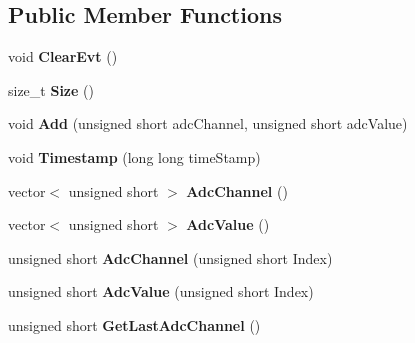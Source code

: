 \subsection*{Public Member Functions}
\begin{DoxyCompactItemize}
\item 
\hypertarget{class_adc_sub_event_a6921cc7a76de6c57de1f4505aa3a0fc6}{void {\bfseries Clear\-Evt} ()}\label{class_adc_sub_event_a6921cc7a76de6c57de1f4505aa3a0fc6}

\item 
\hypertarget{class_adc_sub_event_aefa9fcc6a598d13e775ef6ab3a4c8d57}{size\-\_\-t {\bfseries Size} ()}\label{class_adc_sub_event_aefa9fcc6a598d13e775ef6ab3a4c8d57}

\item 
\hypertarget{class_adc_sub_event_afff9f0777f4eed5da2e596d65247d1ff}{void {\bfseries Add} (unsigned short adc\-Channel, unsigned short adc\-Value)}\label{class_adc_sub_event_afff9f0777f4eed5da2e596d65247d1ff}

\item 
\hypertarget{class_adc_sub_event_a9ae27303e054dc233160f03360f5d9db}{void {\bfseries Timestamp} (long long time\-Stamp)}\label{class_adc_sub_event_a9ae27303e054dc233160f03360f5d9db}

\item 
\hypertarget{class_adc_sub_event_ae9b2f13ea3c9f93a5ad9c976aacd986e}{vector$<$ unsigned short $>$ {\bfseries Adc\-Channel} ()}\label{class_adc_sub_event_ae9b2f13ea3c9f93a5ad9c976aacd986e}

\item 
\hypertarget{class_adc_sub_event_ac35e71c13f62eff54dff047c81dc87e1}{vector$<$ unsigned short $>$ {\bfseries Adc\-Value} ()}\label{class_adc_sub_event_ac35e71c13f62eff54dff047c81dc87e1}

\item 
\hypertarget{class_adc_sub_event_acbd64195813827ddec628afa090978cf}{unsigned short {\bfseries Adc\-Channel} (unsigned short Index)}\label{class_adc_sub_event_acbd64195813827ddec628afa090978cf}

\item 
\hypertarget{class_adc_sub_event_a076eeb66b1edcde4fa6bce1a3c5c2bb1}{unsigned short {\bfseries Adc\-Value} (unsigned short Index)}\label{class_adc_sub_event_a076eeb66b1edcde4fa6bce1a3c5c2bb1}

\item 
\hypertarget{class_adc_sub_event_a3afbce187c753a266f05f56e0d46897d}{unsigned short {\bfseries Get\-Last\-Adc\-Channel} ()}\label{class_adc_sub_event_a3afbce187c753a266f05f56e0d46897d}


\end{DoxyCompactItemize}
